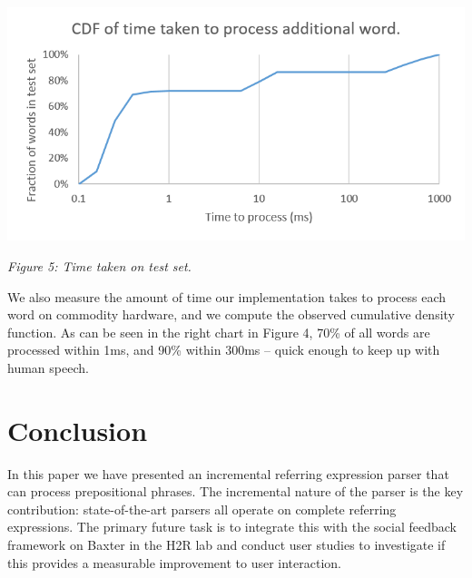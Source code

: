 \documentclass[landscape,a0b]{a0poster}
\numberwithin{equation}{section}
\begin{document}
\begin{multicols*}{3}
\begin{large}
\end{large}

\begin{center}
  \includegraphics[width=0.7\columnwidth]{time_inc}
  
  \textit{Figure 5: Time taken on test set.}
\end{center}

\begin{large}

We also measure the amount of time our implementation takes to process each word on commodity hardware, and we compute the observed cumulative density function. As can be seen in the right chart in Figure 4, 70\% of all words are processed within 1ms, and 90\% within 300ms -- quick enough to keep up with human speech.


\section{Conclusion}
In this paper we have presented an incremental referring expression parser that can process prepositional phrases. The incremental nature of the parser is the key contribution: state-of-the-art parsers all operate on complete referring expressions. The primary future task is to integrate this with the social feedback framework on Baxter in the H2R lab and conduct user studies to investigate if this provides a measurable improvement to user interaction.

\end{large}

\end{multicols*}
\end{document}
